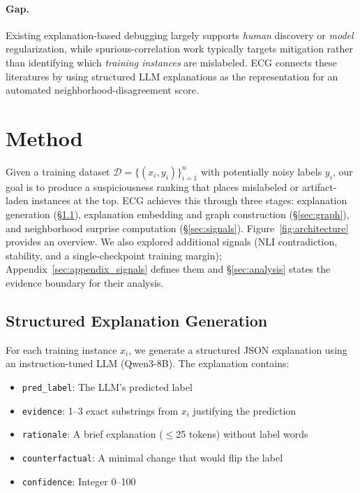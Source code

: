 \documentclass[letterpaper]{article}
\begin{document}
\paragraph{Gap.}
Existing explanation-based debugging largely supports \emph{human} discovery or \emph{model} regularization, while spurious-correlation work typically targets mitigation rather than identifying which \emph{training instances} are mislabeled.
ECG connects these literatures by using structured LLM explanations as the representation for an automated neighborhood-disagreement score.

\section{Method}
\label{sec:method}

Given a training dataset $\mathcal{D} = \{(x_i, y_i)\}_{i=1}^n$ with potentially noisy labels $y_i$, our goal is to produce a suspiciousness ranking that places mislabeled or artifact-laden instances at the top.
ECG achieves this through three stages: explanation generation (\S\ref{sec:explain}), explanation embedding and graph construction (\S\ref{sec:graph}), and neighborhood surprise computation (\S\ref{sec:signals}).
Figure~\ref{fig:architecture} provides an overview.
We also explored additional signals (NLI contradiction, stability, and a single-checkpoint training margin); Appendix~\ref{sec:appendix_signals} defines them and \S\ref{sec:analysis} states the evidence boundary for their analysis.



\subsection{Structured Explanation Generation}
\label{sec:explain}

For each training instance $x_i$, we generate a structured JSON explanation using an instruction-tuned LLM (Qwen3-8B).
The explanation contains:
\begin{itemize}
    \item \texttt{pred\_label}: The LLM's predicted label
    \item \texttt{evidence}: 1--3 exact substrings from $x_i$ justifying the prediction
    \item \texttt{rationale}: A brief explanation ($\leq$25 tokens) without label words
    \item \texttt{counterfactual}: A minimal change that would flip the label
    \item \texttt{confidence}: Integer 0--100
\end{itemize}
\end{document}
